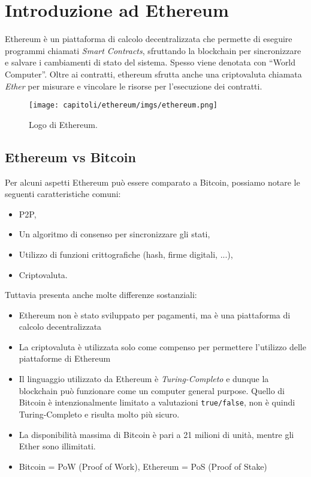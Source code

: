 \chapter{Introduzione ad Ethereum}
Ethereum è un piattaforma di calcolo decentralizzata che permette di eseguire programmi
chiamati \textit{Smart Contracts},
sfruttando la blockchain per sincronizzare e salvare i cambiamenti di stato del sistema.
Spesso viene denotata con ``World Computer''.
Oltre ai contratti, ethereum sfrutta anche una criptovaluta chiamata \textit{Ether} per
misurare e vincolare le risorse per l'esecuzione dei contratti.


\begin{figure}[H]
      \centering
      \texttt{[image: capitoli/ethereum/imgs/ethereum.png]}
      \caption{Logo di Ethereum.}
\end{figure}

\section{Ethereum vs Bitcoin}
Per alcuni aspetti Ethereum può essere comparato a Bitcoin,
possiamo notare le seguenti caratteristiche comuni:

\begin{itemize}
      \item P2P,
      \item Un algoritmo di consenso per sincronizzare gli stati,
      \item Utilizzo di funzioni crittografiche (hash, firme digitali, ...),
      \item Criptovaluta.
\end{itemize}

Tuttavia presenta anche molte differenze sostanziali:

\begin{itemize}
      \item Ethereum non è stato sviluppato per pagamenti, ma è una piattaforma di calcolo
            decentralizzata
      \item La criptovaluta è utilizzata solo come compenso per permettere
            l'utilizzo delle piattaforme di Ethereum
      \item Il linguaggio utilizzato da Ethereum è \textit{Turing-Completo} e dunque
            la blockchain può funzionare come un computer general purpose.
            Quello di Bitcoin è intenzionalmente limitato a valutazioni \verb|true/false|,
            non è quindi Turing-Completo e risulta molto più sicuro.
      \item La disponibilità massima di Bitcoin è pari a 21 milioni di unità, mentre gli
            Ether sono illimitati.
      \item Bitcoin = PoW (Proof of Work), Ethereum = PoS (Proof of Stake)
\end{itemize}

